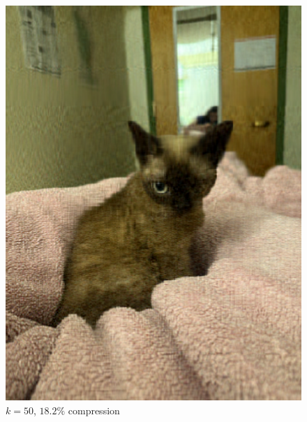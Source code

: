 \documentclass[12pt, letterpaper]{article}
\theoremstyle{definition}
\theoremstyle{remark}
\begin{document}
\begin{figure}[H]
  \centering
  \begin{minipage}[b]{0.4\textwidth}
    \includegraphics[width=\textwidth]{images/compressed_cat_50.png}
    \caption{$k = 50$, $18.2\%$ compression}
  \end{minipage}
  \hfill
  \begin{minipage}[b]{0.4\textwidth}

\end{minipage}
\end{figure}
\end{document}
